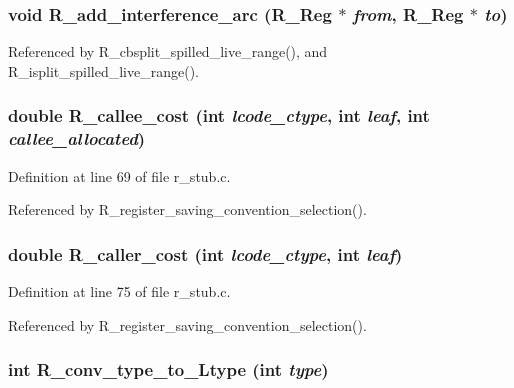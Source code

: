 \subsubsection{\setlength{\rightskip}{0pt plus 5cm}void R\_\-add\_\-interference\_\-arc (\bf{R\_\-Reg} $\ast$ {\em from}, \bf{R\_\-Reg} $\ast$ {\em to})}\label{r__regalloc_8h_8889dced65bab22b9fd6669711d7f7d9}




Referenced by R\_\-cbsplit\_\-spilled\_\-live\_\-range(), and R\_\-isplit\_\-spilled\_\-live\_\-range().
\subsubsection{\setlength{\rightskip}{0pt plus 5cm}double R\_\-callee\_\-cost (int {\em lcode\_\-ctype}, int {\em leaf}, int {\em callee\_\-allocated})}\label{r__regalloc_8h_865fa697be175e9009dbfbd0ddbaded3}




Definition at line 69 of file r\_\-stub.c.

Referenced by R\_\-register\_\-saving\_\-convention\_\-selection().
\subsubsection{\setlength{\rightskip}{0pt plus 5cm}double R\_\-caller\_\-cost (int {\em lcode\_\-ctype}, int {\em leaf})}\label{r__regalloc_8h_06a9b67aa7ff79099512bc9b45121ad0}




Definition at line 75 of file r\_\-stub.c.

Referenced by R\_\-register\_\-saving\_\-convention\_\-selection().
\subsubsection{\setlength{\rightskip}{0pt plus 5cm}int R\_\-conv\_\-type\_\-to\_\-Ltype (int {\em type})}\label{r__regalloc_8h_145831cd48f7466e95577c28c9cee904}




